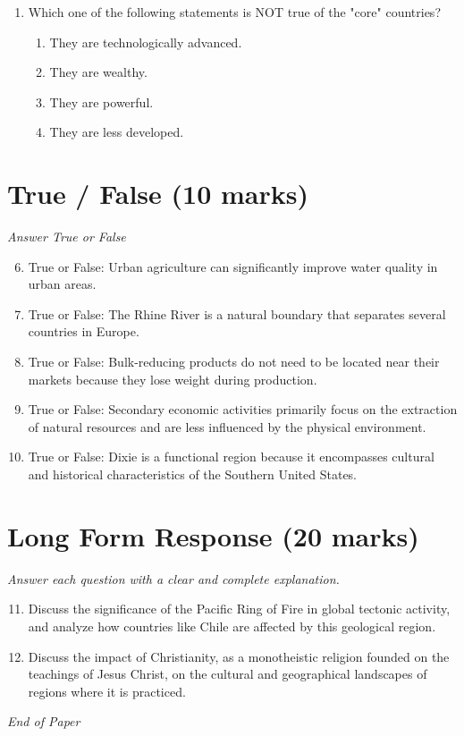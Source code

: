 \documentclass[12pt]{article}
\begin{document}
\begin{enumerate}[label=\arabic*.]
\begin{enumerate}[label=(\alph*)]
    \item It greatly improved crop yields in sub-Saharan Africa.
\end{enumerate}
\item Which one of the following statements is NOT true of the "core" countries?
\begin{enumerate}[label=(\alph*)]
    \item They are technologically advanced.
    \item They are wealthy.
    \item They are powerful.
    \item They are less developed.
\end{enumerate}
\end{enumerate}

\section*{True / False (10 marks)}
\textit{Answer True or False}
\begin{enumerate}[label=\arabic*.]
\setcounter{enumi}{5}
\item True or False: Urban agriculture can significantly improve water quality in urban areas.
\item True or False: The Rhine River is a natural boundary that separates several countries in Europe.
\item True or False: Bulk-reducing products do not need to be located near their markets because they lose weight during production.
\item True or False: Secondary economic activities primarily focus on the extraction of natural resources and are less influenced by the physical environment.
\item True or False: Dixie is a functional region because it encompasses cultural and historical characteristics of the Southern United States.
\end{enumerate}

\section*{Long Form Response (20 marks)}
\textit{Answer each question with a clear and complete explanation.}
\begin{enumerate}[label=\arabic*.]
\setcounter{enumi}{10}
\item Discuss the significance of the Pacific Ring of Fire in global tectonic activity, and analyze how countries like Chile are affected by this geological region.
\item Discuss the impact of Christianity, as a monotheistic religion founded on the teachings of Jesus Christ, on the cultural and geographical landscapes of regions where it is practiced.
\end{enumerate}

\vfill
\noindent\textit{End of Paper}
\end{document}
